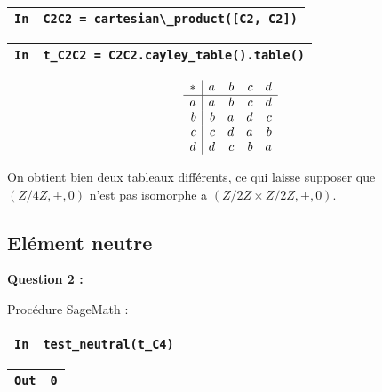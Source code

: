 \documentclass[titlepage]{article}
\begin{document}
        \begin{tabularx}{11.5cm}{|p{0.60cm}|X|}
            \hline
            \verb|In|
            & 
            \verb|C2C2 = cartesian\_product([C2, C2])|
            \\
            \hline
        \end{tabularx}
            
        \begin{tabularx}{11.5cm}{|p{0.60cm}|X|}
            \hline
            \verb|In|
            & 
            \verb|t_C2C2 = C2C2.cayley_table().table()|
            \\
            \hline
        \end{tabularx}

        {\setlength{\arraycolsep}{2ex}
        \[\begin{array}{r|*{4}{r}}
            \multicolumn{1}{c|}{\ast}&a&b&c&d\\\hline
            {}a&a&b&c&d\\
            {}b&b&a&d&c\\
            {}c&c&d&a&b\\
            {}d&d&c&b&a\\
        \end{array}\]}

        On obtient bien deux tableaux différents, ce qui laisse supposer que $(Z/4Z, +, 0)$ n'est pas isomorphe a $(Z/2Z \times Z/2Z, +, 0)$.
        \pagebreak
        \subsection{Elément neutre}
        \textbf{Question 2 :}
        
        Procédure SageMath :

        

        \begin{tabularx}{11.5cm}{|p{0.60cm}|X|}
            \hline
            \verb|In|
            & 
            \verb|test_neutral(t_C4)|
            \\
            \hline
        \end{tabularx}

        \begin{tabularx}{11.5cm}{|p{0.60cm}|X|}
            \hline
            \verb|Out|
            & 
            \verb|0|
            \\
            \hline
        \end{tabularx}\\
        
\end{document}
